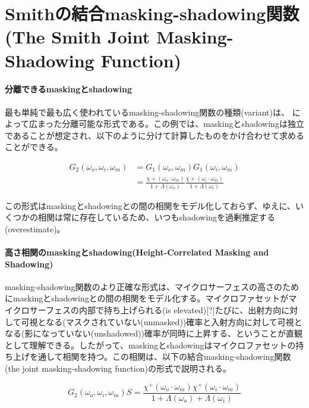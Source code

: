 \documentclass[a4j,xelatex,ja=standard]{bxjsarticle}
\begin{document}
\section{Smithの結合masking-shadowing関数(The Smith Joint Masking-Shadowing Function)}

\paragraph{分離できるmaskingとshadowing}

最も単純で最も広く使われているmasking-shadowing関数の種類(variant)は、\citeauthor{Walter2007} \cite{Walter2007}によって広まった分離可能な形式である。この例では、maskingとshadowingは独立であることが想定され、以下のように分けて計算したものをかけ合わせて求めることができる。

\begin{equation}
    \begin{split}
        G_2(\omega_o, \omega_i, \omega_m) & = G_1(\omega_o, \omega_m) G_1(\omega_i, \omega_m) \\
                                          & = \frac{\chi+(\omega_o \cdot \omega_m)}{1 + \Lambda(\omega_o)} \frac{\chi+(\omega_i \cdot \omega_m)}{1 + \Lambda(\omega_i)}
    \end{split}
    \label{eq:98}
\end{equation}

この形式はmaskingとshadowingとの間の相関をモデル化しておらず、ゆえに、いくつかの相関は常に存在しているため、いつもshadowingを過剰推定する(overestimate)。

\paragraph{高さ相関のmaskingとshadowing(Height-Correlated Masking and Shadowing)}

masking-shadowing関数のより正確な形式は、マイクロサーフェスの高さのためにmaskingとshadowingとの間の相関をモデル化する\cite{Ross2005}。マイクロファセットがマイクロサーフェスの内部で持ち上げられる(is elevated)[?]たびに、出射方向に対して可視となる(マスクされていない(unmasked))確率と入射方向に対して可視となる(影になっていない(unshadowed))確率が同時に上昇する、ということが直観として理解できる。したがって、maskingとshadowingはマイクロファセットの持ち上げを通して相関を持つ。この相関は、以下の結合masking-shadowing関数(the joint masking-shadowing function)の形式で説明される。

\begin{equation}
    G_2(\omega_o, \omega_i, \omega_m) S= \frac{\chi^+(\omega_o \cdot \omega_m) \chi^+(\omega_i \cdot \omega_m)}{1 + \Lambda(\omega_o) + \Lambda(\omega_i)}
    \label{eq:99}
\end{equation}
\end{document}
